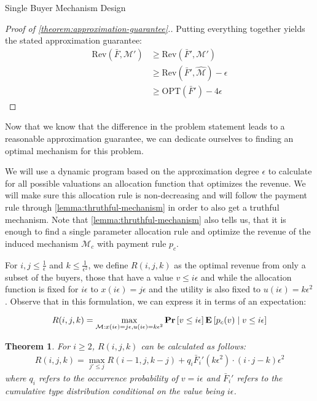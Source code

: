 \documentclass[11pt,a4paper]{article}
\newtheorem{theorem}{Theorem}
\renewcommand{\Pr}[1]{\mbox{\rm\bf Pr}\left[#1\right]}
\newcommand{\Ex}[2][]{\mbox{\rm\bf E}_{#1}\left[#2\right]}
\newcommand{\1}[1]{\mbox{\rm\bf 1}_{#1}}
\begin{document}
\begin{section}{Single Buyer Mechanism Design}
\begin{proof}[Proof of \autoref{theorem:approximation-guarantee}.]
     Putting everything together yields the stated approximation guarantee:
     \begin{align*}
         \mathrm{Rev}(\bar{F}, \mathcal{M}') & \geq \mathrm{Rev}(\bar{F}', \mathcal{M}')                     \\
                                             & \geq \mathrm{Rev}(\bar{F}', \widehat{\mathcal{M}}) - \epsilon \\
                                             & \geq \mathrm{OPT}(\bar{F}') - 4\epsilon
     \end{align*}
 \end{proof}

 Now that we know that the difference in the problem statement leads to a reasonable approximation guarantee,
 we can dedicate ourselves to finding an optimal mechanism for this problem.

 We will use a dynamic program based on the approximation degree $\epsilon$ to calculate for all possible valuations
 an allocation function that optimizes the revenue.
 We will make sure this allocation rule is non-decreasing and will follow the payment rule through \autoref{lemma:thruthful-mechanism}
 in order to also get a truthful mechanism.
 Note that \autoref{lemma:thruthful-mechanism} also tells us, that it is enough to find a single parameter allocation rule and optimize the revenue of the induced mechanism $\mathcal{M}_c$ with payment rule $p_c$.

 For $i,j \leq \frac{1}{\epsilon}$ and $k \leq \frac{1}{\epsilon^2}$,
 we define $R(i,j,k)$ as the optimal revenue from only a subset of the buyers, those that have a value $v \leq i \epsilon$
 and while the allocation function is fixed for $i\epsilon$ to $x(i \epsilon) = j \epsilon$ and the utility is also fixed to $u(i \epsilon) = k \epsilon^2$.
 Observe that in this formulation, we can express it in terms of an expectation:

 \begin{equation}
     \label{eq:rijk}
     R(i,j,k) = \max_{\mathcal{M}: x(i\epsilon) = j\epsilon, u(i\epsilon) = k \epsilon^2} \Pr{v \leq i\epsilon}\Ex{p_c(v)\mid v \leq i \epsilon}
 \end{equation}

 \begin{theorem}
     \label{theorem:recursion-formular}
     For $i \geq 2$, $R(i,j,k)$ can be calculated as follows:
     \begin{align*}
         R(i,j,k) = \max_{j' \leq j} R(i-1, j, k - j) + q_i \bar{F}_i'(k \epsilon^2) \cdot (i\cdot j - k)\epsilon^2
     \end{align*}
     where $q_i$ refers to the occurrence probability of $v = i \epsilon$ and $\bar{F}_i'$ refers to the cumulative type distribution conditional on the value being $i\epsilon$.
 \end{theorem}


\end{section}
\end{document}
